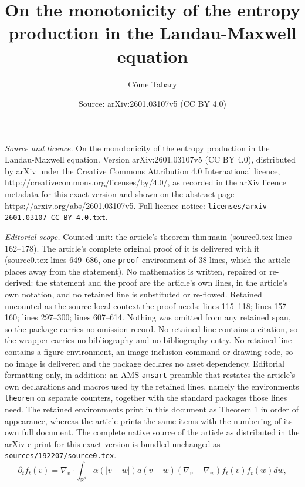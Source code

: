 \documentclass[10pt,a4paper]{amsart}
\title{On the monotonicity of the entropy production in the Landau-Maxwell equation}
\author{C\^ome Tabary}
\date{Source: arXiv:2601.03107v5 (CC BY 4.0)}
\begin{document}
\maketitle

\noindent\emph{Source and licence.} On the monotonicity of the entropy production in the Landau-Maxwell equation. Version arXiv:2601.03107v5 (CC BY 4.0), distributed by arXiv under the Creative Commons Attribution 4.0 International licence, http://creativecommons.org/licenses/by/4.0/, as recorded in the arXiv licence metadata for this exact version and shown on the abstract page https://arxiv.org/abs/2601.03107v5. Full licence notice: \texttt{licenses/arxiv-2601.03107-CC-BY-4.0.txt}.\par\smallskip

\noindent\textit{Editorial scope.} Counted unit: the article's theorem thm:main (source0.tex lines 162--178). The article's complete original proof of it is delivered with it (source0.tex lines 649--686, one \texttt{proof} environment of 38 lines, which the article places away from the statement). No mathematics is written, repaired or re-derived: the statement and the proof are the article's own lines, in the article's own notation, and no retained line is substituted or re-flowed.  Retained uncounted as the source-local context the proof needs: lines 115--118; lines 157--160; lines 297--300; lines 607--614.  Nothing was omitted from any retained span, so the package carries no omission record.  No retained line contains a citation, so the wrapper carries no bibliography and no bibliography entry.  No retained line contains a figure environment, an image-inclusion command or drawing code, so no image is delivered and the package declares no asset dependency.  Editorial formatting only, in addition: an AMS \texttt{amsart} preamble that restates the article's own declarations and macros used by the retained lines, namely the environments \texttt{theorem} on separate counters, together with the standard packages those lines need.  The retained environments print in this document as Theorem 1 in order of appearance, whereas the article prints the same items with the numbering of its own full document.  The complete native source of the article as distributed in the arXiv e-print for this exact version is bundled unchanged as \texttt{sources/192207/source0.tex}.
\begin{equation}
\label{eq:landau}
    \partial_t f_t(v) = \nabla_v \cdot \int_{\mathbb{R}^d} \alpha(\vert v-w \vert) a (v - w) (\nabla_v - \nabla_w) f_t(v)f_t(w) dw,
\end{equation}
\end{document}
